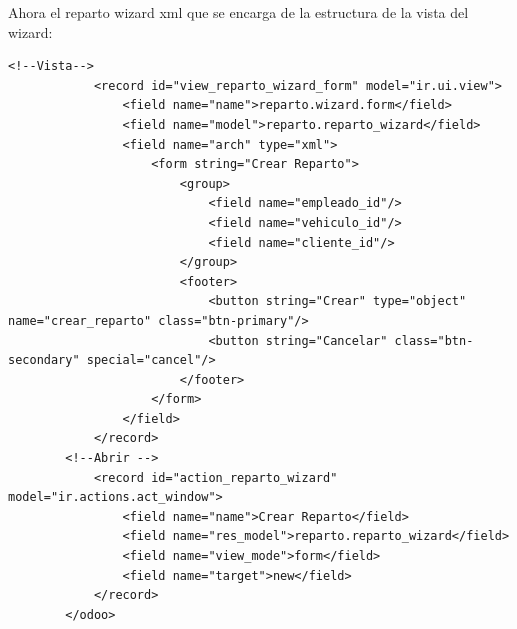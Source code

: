 \documentclass[a4paper, 11pt]{article}
\begin{document}
Ahora el reparto wizard xml que se encarga de la estructura de la vista del wizard:
    \begin{lstlisting}[frame=single,breaklines=true]
        <!--Vista-->
            <record id="view_reparto_wizard_form" model="ir.ui.view">
                <field name="name">reparto.wizard.form</field>
                <field name="model">reparto.reparto_wizard</field>
                <field name="arch" type="xml">
                    <form string="Crear Reparto">
                        <group>
                            <field name="empleado_id"/>
                            <field name="vehiculo_id"/>
                            <field name="cliente_id"/>
                        </group>
                        <footer>
                            <button string="Crear" type="object" name="crear_reparto" class="btn-primary"/>
                            <button string="Cancelar" class="btn-secondary" special="cancel"/>
                        </footer>
                    </form>
                </field>
            </record>
        <!--Abrir -->
            <record id="action_reparto_wizard" model="ir.actions.act_window">
                <field name="name">Crear Reparto</field>
                <field name="res_model">reparto.reparto_wizard</field>
                <field name="view_mode">form</field>
                <field name="target">new</field>
            </record>
        </odoo>
    \end{lstlisting}
\end{document}

